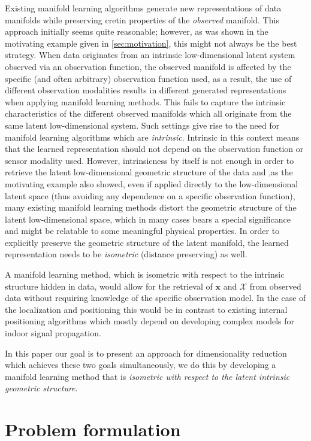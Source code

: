 	Existing manifold learning algorithms generate new representations of data manifolds while preserving cretin properties of the \textit{observed} manifold. This approach initially seems quite reasonable; however, as was shown in the motivating example given in \cref{sec:motivation}, this might not always be the best strategy. When data originates from an intrinsic low-dimensional latent system observed via an observation function, the observed manifold is affected by the specific (and often arbitrary) observation function used, as a result, the use of different observation modalities results in different generated representations when applying manifold learning methods. This fails to capture the intrinsic characteristics of the different observed manifolds which all originate from the same latent low-dimensional system. Such settings give rise to the need for manifold learning algorithms which are \textit{intrinsic}. Intrinsic in this context means that the learned representation should not depend on the observation function or sensor modality used. However, intrinsicness by itself is not enough in order to retrieve the latent low-dimensional geometric structure of the data and ,as the motivating example also showed, even if applied directly to the low-dimensional latent space (thus avoiding any dependence on a specific observation function), many existing manifold learning methods distort the geometric structure of the latent low-dimensional space, which in many cases bears a special significance and might be relatable to some meaningful physical properties. In order to explicitly preserve the geometric structure of the latent manifold, the learned representation needs to be \textit{isometric} (distance preserving) as well. 
		
	A manifold learning method, which is isometric with respect to the intrinsic structure hidden in data, would allow for the retrieval of $\mathbf{x}$ and $\mathcal{X}$ from observed data without requiring knowledge of the specific observation model. In the case of the localization and positioning this would be in contrast to existing internal positioning algorithms which mostly depend on developing complex models for indoor signal propagation.
	
	In this paper our goal is to present an approach for dimensionality reduction which achieves these two goals simultaneously, we do this by developing a manifold learning method that is \textit{isometric with respect to the latent intrinsic geometric structure}.
	
	
\section{Problem formulation}
	\label{sec:setting}


